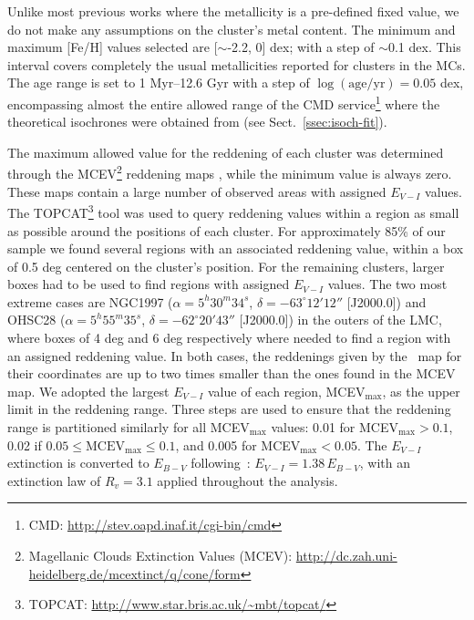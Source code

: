 \documentclass[draft]{aa}
\begin{document}
Unlike most previous works where the metallicity is a pre-defined fixed
value, we do not make any assumptions on the cluster's metal content. The
minimum and maximum [Fe/H] values selected are [$\sim$-2.2, 0] dex; with a step
of $\sim$0.1 dex. This interval covers completely the usual metallicities
reported for clusters in the MCs.
The age range is set to 1 Myr--12.6 Gyr with a step of
$\log\mathrm{(age/yr)}=0.05$ dex, encompassing almost the entire allowed range
of the CMD service\footnote{CMD\@: \url{http://stev.oapd.inaf.it/cgi-bin/cmd}}
where the theoretical isochrones were obtained from (see
Sect.~\ref{ssec:isoch-fit}).

The maximum allowed value for the reddening of each cluster was determined
through the MCEV\footnote{Magellanic Clouds Extinction Values (MCEV):
\url{http://dc.zah.uni-heidelberg.de/mcextinct/q/cone/form}} reddening maps
\citep{Haschke_2011}, while the minimum value is always zero.
%
These maps contain a large number of observed areas with assigned $E_{V-I}$
values.
The TOPCAT\footnote{TOPCAT\@: \url{http://www.star.bris.ac.uk/~mbt/topcat/}}
tool was used to query reddening values within a region as small as possible
around the positions of each cluster.
For approximately 85\% of our sample we found several regions with an associated
reddening value, within a box of 0.5 deg centered on the cluster's position.
For the remaining clusters, larger boxes had to be used to find regions with
assigned $E_{V-I}$ values. The two most extreme cases are NGC1997
($\alpha{=}5^h30^m34^s$, $\delta{=}-63^\circ12'12''$ [J2000.0]) and OHSC28
($\alpha{=}5^h55^m35^s$, $\delta{=}-62^\circ20'43''$ [J2000.0]) in the outers
of the LMC, where boxes of 4 deg and 6 deg respectively where needed to find a
region with an assigned reddening value. In both cases, the reddenings given by
the~\cite{Schlafly_2011} map for their coordinates are up to two times smaller
than the ones found in the MCEV map.
%
We adopted the largest $E_{V-I}$ value of each region, MCEV$_{\max}$, as the
upper limit in the reddening range. Three steps are used to ensure that the
reddening range is partitioned similarly for all MCEV$_{\max}$ values: 0.01 for
MCEV$_{\max} {>}0.1$, 0.02 if $0.05{\leq}\mathrm{MCEV}_{\max}{\leq}0.1$, and
0.005 for MCEV$_{\max}{<}0.05$.
%
The $E_{V-I}$ extinction is converted to $E_{B-V}$
following~\cite{Tammann_2003}: $E_{V-I}{=}1.38\,E_{B-V}$, with an extinction
law of $R_v{=}3.1$ applied throughout the analysis.
\end{document}
